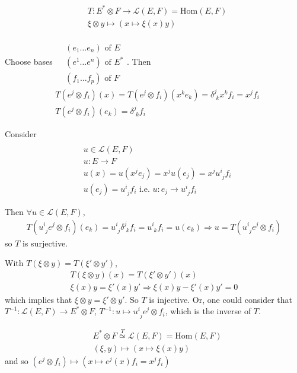 \begin{enumerate}
	\[
	\begin{aligned}
	& T: E^*\otimes F \to \mathcal{L}(E,F) = \text{Hom}(E,F) \\
	& \xi \otimes y  \mapsto (x \mapsto \xi(x)y)
	\end{aligned}
	\]
	
	Choose bases $\begin{aligned} & \quad \\
	& (e_1 \dots e_n) \text{ of } E \\
	& (e^1 \dots e^n) \text{ of } E^* \\  
	& (f_1 \dots f_p) \text{ of } F 
	\end{aligned}$.  Then
	\[
	\begin{aligned}
	& T(e^j\otimes f_i)(x) = T(e^j\otimes f_i)(x^ke_k) = \delta^j_{\,\,k} x^k f_i = x^j f_i \\
	& T(e^j\otimes f_i)(e_k) = \delta^j_{\,\,k}f_i
	\end{aligned}
	\]
	
	Consider 
	\[
	\begin{aligned} & \quad \\
	& u \in \mathcal{L}(E,F) \\
	& u: E \to F \\
	& u(x) = u(x^je_j) = x^ju(e_j) = x^j u^i_{\,\,j} f_i \\
	& u(e_j) = u^i_{\,\,j}f_i \text{ i.e. } u: e_j \to u^i_{\,\,j}f_i \end{aligned}
	\]
	
	Then $\forall u \in \mathcal{L}(E,F)$,
	\[
	\begin{gathered}
	T(u^i_{\,\, j} e^j \otimes f_i)(e_k) = u^i_{\,\,j}\delta^j_{\,\,k}f_i = u^i_{\,\,k}f_i = u(e_k) \Longrightarrow u = T(u^i_{\,\,j}e^j\otimes f_i)
	\end{gathered}
	\]
	so $T$ is surjective.  
	
	With $T(\xi\otimes y) = T(\xi'\otimes y')$, 
	\[
	\begin{gathered}
	T(\xi\otimes y)(x) = T(\xi' \otimes y')(x) \\
	\xi(x)y = \xi'(x)y' \Longrightarrow \xi(x)y - \xi'(x)y' = 0 
	\end{gathered}
	\]
	which implies that $\xi\otimes y = \xi'\otimes y'$.  So $T$ is injective.  Or, one could consider that $T^{-1} : \mathcal{L}(E,F) \to E^*\otimes F$, $T^{-1} : u \mapsto u^i_{\,\,j}e^j\otimes f_i$, which is the inverse of $T$.  
	
	\begin{remark}
		\[
		\begin{aligned}
		& E^* \otimes F \overset{T}{\simeq} \mathcal{L}(E,F) = \text{Hom}(E,F) \\ 
		& (\xi, y) \mapsto (x \mapsto \xi(x)y) 
		\end{aligned}
		\]
		and so $(e^j \otimes f_i) \mapsto (x\mapsto e^j(x)f_i = x^jf_i)$
		

\end{remark}
\end{enumerate}
